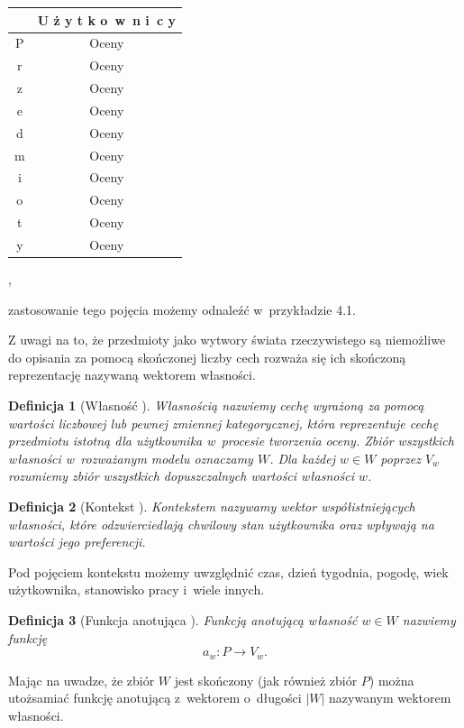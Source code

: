 \documentclass[12pt,a4paper]{report}
\newtheorem{df}{Definicja}[chapter]
\newcommand{\setPrzedmioty}{\mathit{P}}
\newcommand{\setWlasnosci}{\mathit{W}}
\begin{document}
\begin{center}
\begin{tabular}{|c|c|} \hline
 & U ż y t k o~w~n i~c y  \\
\hline
\hline
P & Oceny \\
\hline
r & Oceny \\
\hline
z & Oceny  \\
\hline
e & Oceny \\
\hline
d & Oceny \\
\hline
m & Oceny \\
\hline
i & Oceny \\
\hline
o & Oceny \\
\hline
t & Oceny \\
\hline
y & Oceny \\
\hline
\end{tabular},
\end{center}
zastosowanie tego pojęcia możemy odnaleźć w~przykładzie 4.1.
\bigskip

Z uwagi na to, że przedmioty jako wytwory świata rzeczywistego są niemożliwe do opisania za pomocą skończonej liczby cech  rozważa się ich skończoną reprezentację nazywaną wektorem własności.

\begin{df}[Własność {\citep[Sec 1.3]{kidzinski}}]
Własnością nazwiemy cechę wyrażoną za pomocą wartości liczbowej lub pewnej zmiennej kategorycznej, która reprezentuje cechę przedmiotu istotną dla użytkownika w~procesie tworzenia oceny. Zbiór wszystkich własności w~rozważanym modelu oznaczamy $\setWlasnosci$. Dla każdej $w \in \setWlasnosci$ poprzez $V_w$ rozumiemy zbiór wszystkich dopuszczalnych wartości własności $w$.
\end{df}

\begin{df}[Kontekst {\citep[Sec 3]{bre}}]
Kontekstem nazywamy wektor współistniejących własności, które odzwierciedlają chwilowy stan użytkownika oraz wpływają na wartości jego preferencji.
\end{df}

Pod pojęciem kontekstu możemy uwzględnić czas, dzień tygodnia, pogodę, wiek użytkownika, stanowisko pracy i~wiele innych.

\begin{df}[Funkcja anotująca {\citep[Sec 1.3]{kidzinski}}]
Funkcją anotującą własność $w \in \setWlasnosci$ nazwiemy funkcję 
$$
a_w \colon \setPrzedmioty \to V_w.
$$
\end{df}

Mając na uwadze, że zbiór $\setWlasnosci$ jest skończony (jak również zbiór $\setPrzedmioty$) można utożsamiać funkcję anotującą z~wektorem o~długości $|\setWlasnosci|$ nazywanym wektorem własności.
\end{document}
